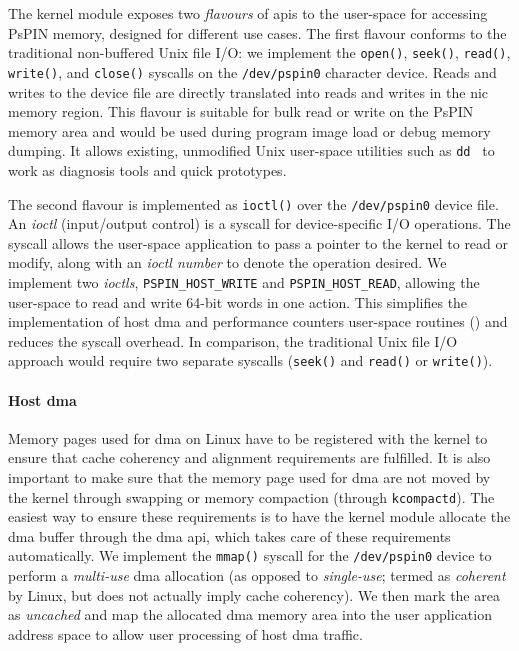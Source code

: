 The kernel module exposes two \emph{flavours} of \ac{api}s to the user-space for accessing PsPIN memory, designed for different use cases.  The first flavour conforms to the traditional non-buffered Unix file I/O: we implement the \texttt{open()}, \texttt{seek()}, \texttt{read()}, \texttt{write()}, and \texttt{close()} syscalls on the \texttt{/dev/pspin0} character device.  Reads and writes to the device file are directly translated into reads and writes in the \ac{nic} memory region.  This flavour is suitable for bulk read or write on the PsPIN memory area and would be used during program image load or debug memory dumping.  It allows existing, unmodified Unix user-space utilities such as \texttt{dd}~\cite{noauthor_ieee_2018} to work as diagnosis tools and quick prototypes.

The second flavour is implemented as \texttt{ioctl()} over the \texttt{/dev/pspin0} device file.  An \emph{ioctl} (input/output control) is a syscall for device-specific I/O operations.  The syscall allows the user-space application to pass a pointer to the kernel to read or modify, along with an \emph{ioctl number} to denote the operation desired.   We implement two \emph{ioctls}, \texttt{PSPIN\_\-HOST\_\-WRITE} and \texttt{PSPIN\_\-HOST\_\-READ}, allowing the user-space to read and write 64-bit words in one action.  This simplifies the implementation of host \ac{dma} and performance counters user-space routines () and reduces the syscall overhead.  In comparison, the traditional Unix file I/O approach would require two separate syscalls (\texttt{seek()} and \texttt{read()} or \texttt{write()}).

\paragraph{Host \ac{dma}} Memory pages used for \ac{dma} on Linux have to be registered with the kernel to ensure that cache coherency and alignment requirements are fulfilled.  It is also important to make sure that the memory page used for \ac{dma} are not moved by the kernel through swapping or memory compaction (through \texttt{kcompactd}).  The easiest way to ensure these requirements is to have the kernel module allocate the \ac{dma} buffer through the \ac{dma} \ac{api}, which takes care of these requirements automatically.  We implement the \texttt{mmap()} syscall for the \texttt{/dev/pspin0} device to perform a \emph{multi-use} \ac{dma} allocation (as opposed to \emph{single-use}; termed as \emph{coherent} by Linux, but does not actually imply cache coherency).  We then mark the area as \emph{uncached} and map the allocated \ac{dma} memory area into the user application address space to allow user processing of host \ac{dma} traffic.

